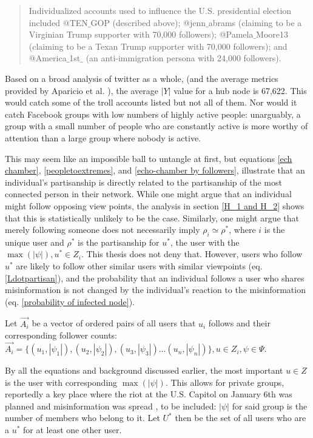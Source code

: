 \documentclass[preprint,review,12pt]{elsarticle}
\begin{document}
\begin{quote}
Individualized accounts used to influence the U.S. presidential election included @TEN$\_$GOP (described above); @jenn$\_$abrams (claiming to be a Virginian Trump supporter with 70,000 followers); @Pamela$\_$Moore13 (claiming to be a Texan Trump supporter with 70,000
followers); and @America$\_$1st$\_$ (an anti-immigration persona with 24,000 followers). \cite{mueller2019mueller}
\end{quote}

Based on a broad analysis of twitter as a whole, (and the average metrics provided by Aparicio et al. \cite{aparicio2015model}), the average $|Y|$ value for a hub node is 67,622. This would catch some of the troll accounts listed but not all of them. Nor would it catch Facebook groups with low numbers of highly active people: unarguably, a group with a small number of people who are constantly active is more worthy of attention than a large group where nobody is active.

This may seem like an impossible ball to untangle at first, but equations \ref{ech chamber}, \ref{peopletoextremes}, and \ref{echo-chamber by followers}, illustrate that an individual's partisanship is directly related to the partisanship of the most connected person in their network. While one might argue that an individual might follow opposing view points, the analysis in section \ref{H_1 and H_2} shows that this is statistically unlikely to be the case. Similarly, one might argue that merely following someone does not necessarily imply $\rho_i \simeq \rho^*$, where $i$ is the unique user and $\rho^*$ is the partisanship for $u^*$, the user with the $\max(|\psi|), u^* \in Z_i$. This thesis does not deny that. However, users who follow $u^*$ are likely to follow other similar users with similar viewpoints (eq. \ref{Ldotpartisan}), and the probability that an individual follows a user who shares misinformation is not changed by the individual's reaction to the misinformation (eq. \ref{probability of infected node}).

Let $\vec{A_i}$ be a vector of ordered pairs of all users that $u_i$ follows and their corresponding follower counts: $\vec{A_i}=\{(u_1,|\psi_1|),(u_2,|\psi_2|),(u_3,|\psi_3|)\dots (u_n,|\psi_n|)\}, u \in Z_i, \psi \in \Psi$.

By all the equations and background discussed earlier, the most important $u \in Z$ is the user with corresponding $\max(|\psi|)$. This allows for private groups, reportedly a key place where the riot at the U.S. Capitol on January 6th was planned and misinformation was spread \cite{yin2021facebook,horwitz2020facebook}, to be included: $|\psi|$ for said group is the number of members who belong to it. Let $U^*$ then be the set of all users who are a $u^*$ for at least one other user.
\end{document}
